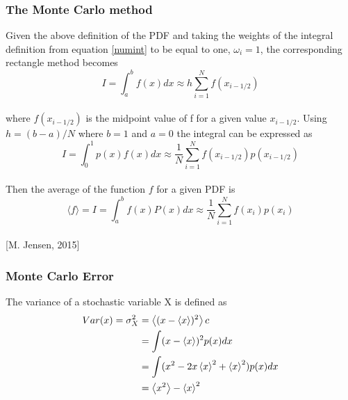 \documentclass[%
reprint,nofootinbib,
amsmath,amssymb,
aps,
]{revtex4-1}
\begin{document}
\subsubsection{The Monte Carlo method} \noindent 
Given the above definition of the PDF and taking the weights of the integral definition from equation \ref{numint} to be equal to one, $\omega_i = 1$, the corresponding rectangle method becomes \\
\begin{equation*}
I = \int_{a}^{b}f(x)dx \approx h\sum_{i=1}^{N}f(x_{i-1/2})
\end{equation*} \vspace{2mm} \\
where $f(x_{i-1/2})$ is the midpoint value of f for a given value $x_{i-1/2}$. Using $h = (b-a)/N$ where $b=1$ and $a=0$ the integral can be expressed as\vspace{2mm} \\
\begin{equation*}
I = \int_{0}^{1}p(x)f(x)dx \approx \dfrac{1}{N}\sum_{i=1}^{N}f(x_{i-1/2})p(x_{i-1/2})
\end{equation*} \vspace{2mm} \\
Then the average of the function $f$ for a given PDF is\vspace{2mm} \\
\begin{equation}\label{mcint}
\langle f \rangle = I = \int_{a}^{b}f(x)P(x)dx \approx \dfrac{1}{N}\sum_{i=1}^{N}f(x_i)p(x_i) 
\end{equation}\\

\hspace{52mm} [M. Jensen, 2015]

\subsubsection{Monte Carlo Error}\noindent 
The variance of a stochastic variable X is defined as\\
\begin{align}\label{var}
	Var(x) = \sigma_X^2 &= \expval{(x-\expval{x})^2} c\nonumber \\
	&= \int(x-\expval{x})^2p(x)dx\nonumber\\
	&= \int(x^2-2x\expval{x}^2+ \expval{x}^2)p(x)dx\nonumber\\
	& = \expval{x^2} - \expval{x}^2 \nonumber \\ 
\end{align} \\
\end{document}
